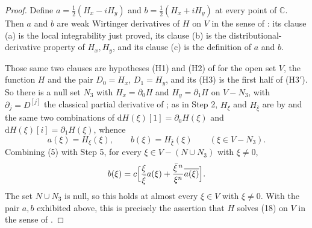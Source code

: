 \begin{proof}
Define $a=\tfrac12(H_x-iH_y)$ and $b=\tfrac12(H_x+iH_y)$ at every point of
$\mathbb{C}$.  Then $a$ and $b$ are weak Wirtinger derivatives of $H$ on $V$
in the sense of : its clause (a) is the local
integrability just proved, its clause (b) is the distributional-derivative
property of $H_x,H_y$, and its clause (c) is the definition of $a$ and $b$.

Those same two clauses are hypotheses (H1) and (H2) of
 for the open set $V$, the function $H$ and the
pair $D_0=H_x$, $D_1=H_y$, and its (H3) is the first half of (H3$'$).  So
there is a null set $N_3$ with $H_x=\partial_0H$ and $H_y=\partial_1H$ on
$V-N_3$, with $\partial_j=D^{[j]}$ the classical partial derivative of
; as in Step 2, $H_\xi$ and $H_{\bar\xi}$ are by
 and  the same two combinations of
$\mathrm{d}H(\xi)[1]=\partial_0H(\xi)$ and
$\mathrm{d}H(\xi)[i]=\partial_1H(\xi)$, whence
\begin{equation}\tag{5}
  a(\xi)=H_\xi(\xi),\qquad b(\xi)=H_{\bar\xi}(\xi)\qquad(\xi\in V-N_3).
\end{equation}
Combining (5) with Step 5, for every $\xi\in V-(N\cup N_3)$ with $\xi\neq0$,
\[
  b(\xi)=c\Bigl[\frac{\xi}{\bar\xi}a(\xi)
    +\frac{\bar\xi^{\,n}}{\xi^{n}}\overline{a(\xi)}\Bigr].
\]
The set $N\cup N_3$ is null, so this holds at almost every $\xi\in V$ with
$\xi\neq0$.  With the pair $a,b$ exhibited above, this is precisely the
assertion that $H$ solves (18) on $V$ in the sense of .
\end{proof}
